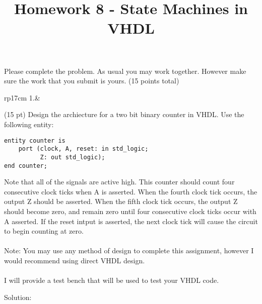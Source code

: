 \documentclass{article}
\title{Homework 8 - State Machines in VHDL}
\date{}
\begin{document}
\maketitle
Please complete the problem.  As usual you may work together.  However make sure the work that you submit is yours. (15 points total)
\begin{longtable}[l]{rp{17cm}}
1.&\begin{minipage}[t]{\linewidth}(15 pt) Design the archiecture for a two bit binary counter in VHDL.  Use the following entity:
\lstset{language=VHDL}
\begin{lstlisting}
entity counter is
    port (clock, A, reset: in std_logic;
          Z: out std_logic);
end counter;
\end{lstlisting}
Note that all of the signals are active high.  This counter should count four consecutive clock ticks when A is asserted.  When the fourth clock tick occurs, the output Z should be asserted.  When the fifth clock tick occurs, the output Z should become zero, and remain zero until four consecutive clock ticks occur with A asserted.  If the reset intput is asserted, the next clock tick will cause the circuit to begin counting at zero.\\ \\
Note: You may use any method of design to complete this assignment, however I would recommend using direct VHDL design.\\ \\
I will provide a test bench that will be used to test your VHDL code.

Solution: \\ \\

\end{minipage}\\
\medskip
\end{longtable}
\end{document}
